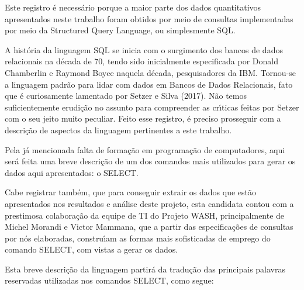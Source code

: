 \documentclass[
12pt,		%
openright,	%
twoside,  %
a4paper,			%
chapter=TITLE,		%
english,			%
french,				%
spanish,			%
brazil				%
]{USPSC-classe/USPSC}
\begin{document}
Este registro \'e necess\'ario porque a maior parte dos dados quantitativos apresentados neste trabalho foram obtidos por meio de consultas implementadas por meio da Structured Query Language, ou simplesmente SQL.










A hist\'oria da linguagem SQL se inicia com o surgimento dos bancos de dados relacionais na d\'ecada de 70, tendo sido inicialmente especificada por Donald Chamberlin e Raymond Boyce naquela d\'ecada, pesquisadores da IBM. Tornou-se a linguagem padr\~ao para lidar com dados em Bancos de Dados Relacionais, fato que \'e curiosamente lamentado por  Setzer e Silva (2017). N\~ao temos suficientemente erudi\c{c}\~ao no assunto para compreender as cr\'{\i}ticas feitas por Setzer com o seu jeito muito peculiar. Feito esse registro, \'e preciso prosseguir com a descri\c{c}\~ao de aspectos da linguagem pertinentes a este trabalho.










Pela j\'a mencionada falta de forma\c{c}\~ao em programa\c{c}\~ao de computadores, aqui ser\'a feita uma breve descri\c{c}\~ao de um dos comandos mais utilizados para gerar os dados aqui apresentados: o SELECT.










Cabe registrar tamb\'em, que para conseguir extrair os dados que est\~ao apresentados nos resultados e an\'alise deste projeto, esta candidata contou com a prestimosa colabora\c{c}\~ao da equipe de TI do Projeto WASH, principalmente de Michel Morandi e Victor Mammana, que a partir das especifica\c{c}\~oes de consultas por n\'os elaboradas, constru\'{\i}am as formas mais sofisticadas de emprego do comando SELECT, com vistas a gerar os dados.










Esta breve descri\c{c}\~ao da linguagem partir\'a da tradu\c{c}\~ao das principais palavras reservadas utilizadas nos comandos SELECT, como segue:
\end{document}
